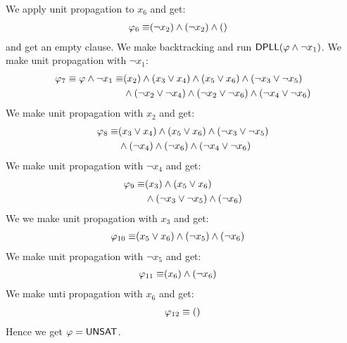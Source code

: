 We apply unit propagation to $x_6$ and get:
\begin{align*}
 \varphi_6 \equiv &
   (\neg x_2) \land
   (\neg x_2) \land
   ()
\end{align*}
and get an empty clause. We make backtracking and run $\mathsf{DPLL}(\varphi \land \neg x_1)$. We make unit propagation with $\neg x_1$:
\begin{align*}
\varphi_7 \equiv \varphi \land \neg x_1 \equiv & (x_2) \land
  (x_3 \lor x_4) \land
  (x_5 \lor x_6) \land
  (\neg x_3 \lor \neg x_5) \\ & \land
  (\neg x_2 \lor \neg x_4) \land
  (\neg x_2 \lor \neg x_6) \land
  (\neg x_4 \lor \neg x_6)
\end{align*}
We make unit propagation with $x_2$ and get:
\begin{align*}
\varphi_8 \equiv &
  (x_3 \lor x_4) \land
  (x_5 \lor x_6) \land
  (\neg x_3 \lor \neg x_5) \\ & \land
  (\neg x_4) \land
  (\neg x_6) \land
  (\neg x_4 \lor \neg x_6)
\end{align*}
We make unit propagation with $\neg x_4$ and get:
\begin{align*}
\varphi_9 \equiv &
  (x_3) \land
  (x_5 \lor x_6) \\ & \land
  (\neg x_3 \lor \neg x_5)  \land
  (\neg x_6)
\end{align*}
We we make unit propagation with $x_3$ and get:
\begin{align*}
\varphi_{10} \equiv &
  (x_5 \lor x_6) \land
  (\neg x_5)  \land
  (\neg x_6)
\end{align*}
We make unit propagation with $\neg x_5$ and get:
\begin{align*}
\varphi_{11} \equiv &
  (x_6) \land
  (\neg x_6)
\end{align*}
We make unti propagation with $x_6$ and get:
\begin{align*}
  \varphi_{12} \equiv ()
\end{align*}
Hence we get $\varphi = \mathsf{UNSAT}$.


